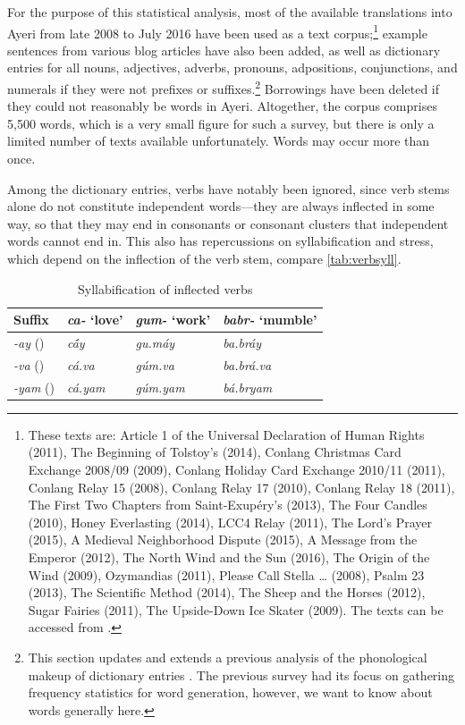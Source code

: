For the purpose of this statistical analysis, most of the available
translations into Ayeri from late 2008 to July 2016 have been used as a text
corpus;\footnote{These texts are: Article 1 of the Universal Declaration of
Human Rights (2011), The Beginning of Tolstoy's  (2014),
Conlang Christmas Card Exchange 2008/09 (2009), Conlang Holiday Card Exchange
2010/11 (2011), Conlang Relay 15 (2008), Conlang Relay 17 (2010), Conlang Relay
18 (2011), The First Two Chapters from Saint-Exupéry's 
(2013), The Four Candles (2010), Honey Everlasting (2014), LCC4 Relay (2011),
The Lord's Prayer (2015), A Medieval Neighborhood Dispute (2015), A Message
from the Emperor (2012), The North Wind and the Sun (2016), The Origin of the
Wind (2009), Ozymandias (2011), Please Call Stella … (2008), Psalm 23 (2013),
The Scientific Method (2014), The Sheep and the Horses (2012), Sugar Fairies
(2011), The Upside-Down Ice Skater (2009). The texts can be accessed from
\citet[Examples]{benung}.\label{fn:phonocorpus} } example sentences from
various blog articles have also been added, as well as dictionary entries for
all nouns, adjectives, adverbs, pronouns, adpositions, conjunctions, and
numerals if they were not prefixes or suffixes.\footnote{This section updates
and extends a previous analysis of the phonological makeup of dictionary
entries \autocite{becker:frequency}. The previous survey had its focus on
gathering frequency statistics for word generation, however, we want to know
about words generally here.} Borrowings have been deleted if they could not
reasonably be words in Ayeri. Altogether, the corpus comprises 5,500 words,
which is a very small figure for such a survey, but there is only a limited
number of texts available unfortunately. Words may occur more than once.

Among the dictionary entries, verbs have notably been ignored, since verb stems
alone do not constitute independent words---they are always inflected in some
way, so that they may end in consonants or consonant clusters that independent
words cannot end in. This also has repercussions on syllabification and stress,
which depend on the inflection of the verb stem, compare
\autoref{tab:verbsyll}.

\begin{table}
\caption{Syllabification of inflected verbs}
\begin{tabu} to \linewidth {X[2l] X[3c] X[3c] X[3c]}
\toprule\tableheaderfont
Suffix
	& \emph{ca-} `love'
	& \emph{gum-} `work'
	& \emph{babr-} `mumble'
	\\

\toprule

\emph{-ay} (\Fsg{})
	& \emph{cā́y}
	& \emph{gu.máy}
	& \emph{ba.bráy}
	\\

\emph{-va} (\Ssg{})
	& \emph{cá.va}
	& \emph{gúm.va}
	& \emph{ba.brá.va}
	\\

\emph{-yam} (\Ptcp{})
	& \emph{cá.yam}
	& \emph{gúm.yam}
	& \emph{bá.bryam}
	\\

\bottomrule
\end{tabu}
\label{tab:verbsyll}
\end{table}

